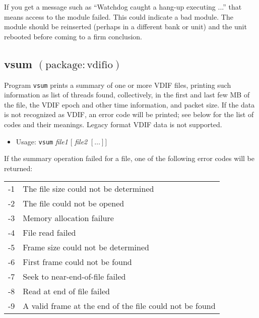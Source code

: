 If you get a message such as ``Watchdog caught a hang-up executing ...'' that means access to the module failed.
This could indicate a bad module.
The module should be reinserted (perhaps in a different bank or unit) and the unit rebooted before coming to a firm conclusion.








\subsection{vsum {\small $\mathrm{(package: vdifio)}$}} \label{sec:vsum}

Program {\tt vsum} prints a summary of one or more VDIF files, printing such information as list of threads found, collectively, in the first and last few MB of the file, the VDIF epoch and other time information, and packet size.
If the data is not recognized as VDIF, an error code will be printed; see below for the list of codes and their meanings.
Legacy format VDIF data is not supported.

\begin{itemize}
\item[] Usage: {\tt vsum} {\em file1} $[$ {\em file2} $[ \ldots ] ]$
\end{itemize}

If the summary operation failed for a file, one of the following error codes will be returned:
\begin{center}
\begin{tabular}{ll}
-1 & The file size could not be determined \\
-2 & The file could not be opened \\
-3 & Memory allocation failure \\
-4 & File read failed \\
-5 & Frame size could not be determined \\
-6 & First frame could not be found \\
-7 & Seek to near-end-of-file failed \\
-8 & Read at end of file failed \\
-9 & A valid frame at the end of the file could not be found \\
\end{tabular}
\end{center}





